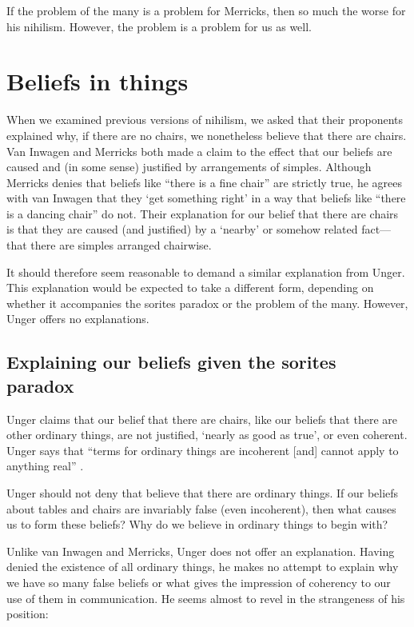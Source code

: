 \documentclass[11pt]{article}
\begin{document}
\begin{spacing}{1.5}
If the problem of the many is a problem for Merricks, then so much the
worse for his nihilism.  However, the problem is a problem for us as
well.

\section{Beliefs in things}
\label{u-belief}
When we examined previous versions of nihilism, we asked that their
proponents explained why, if there are no chairs, we nonetheless
believe that there are chairs.  Van Inwagen and Merricks both made a
claim to the effect that our beliefs are caused and (in some sense)
justified by arrangements of simples.  Although Merricks denies that
beliefs like ``there is a fine chair'' are strictly true, he agrees
with van Inwagen that they `get something right' in a way that beliefs
like ``there is a dancing chair'' do not.  Their explanation for our
belief that there are chairs is that they are caused (and justified)
by a `nearby' or somehow related fact---that there are simples
arranged chairwise.

It should therefore seem reasonable to demand a similar explanation
from Unger.  This explanation would be expected to take a different
form, depending on whether it accompanies the sorites paradox or the
problem of the many.  However, Unger offers no explanations.  

\subsection{Explaining our beliefs given the sorites paradox}
\label{expl-sorites}
Unger claims that our belief that there are chairs, like our beliefs
that there are other ordinary things, are not justified, `nearly as
good as true', or even coherent.  Unger says that ``terms for ordinary
things are incoherent [and] cannot apply to anything real''
\citep[147]{unger1979}.

Unger should not deny that believe that there are ordinary things.  If
our beliefs about tables and chairs are invariably false (even
incoherent), then what causes us to form these beliefs?  Why do we
believe in ordinary things to begin with?

Unlike van Inwagen and Merricks, Unger does not offer an explanation.
Having denied the existence of all ordinary things, he makes no
attempt to explain why we have so many false beliefs or what gives the
impression of coherency to our use of them in communication.  He seems
almost to revel in the strangeness of his position:


\end{spacing}
\end{document}
